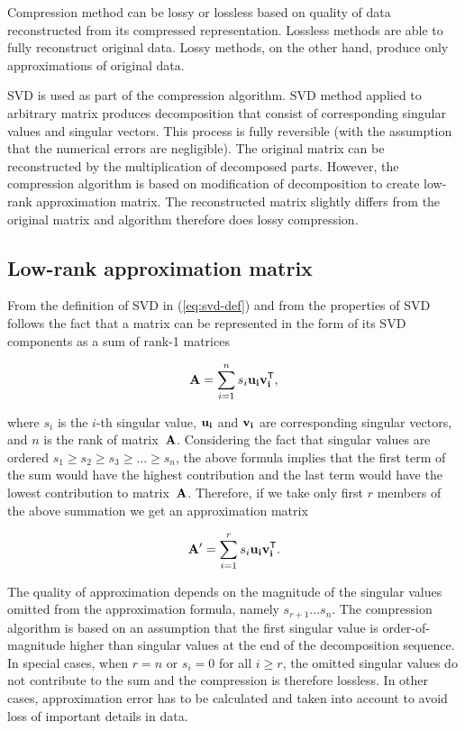 Compression method can be lossy or lossless based on quality of data reconstructed from its compressed representation. Lossless methods are able to fully reconstruct original data. Lossy methods, on the other hand, produce only approximations of original data. 

SVD is used as part of the compression algorithm. SVD method applied to arbitrary matrix produces decomposition that consist of corresponding singular values and singular vectors. This process is fully reversible (with the assumption that the numerical errors are negligible). The original matrix can be reconstructed by the multiplication of decomposed parts. However, the compression algorithm is based on modification of decomposition to create low-rank approximation matrix. The reconstructed matrix slightly differs from the original matrix and algorithm therefore does lossy compression.

\subsection{Low-rank approximation matrix}

From the definition of SVD in (\ref{eq:svd-def}) and from the properties of SVD follows the fact that a matrix can be represented in the form of its SVD components as a sum of rank-1 matrices

\begin{equation}
\mathbf{A}=\sum_{i=1}^{n} s_{i}\bf{u}_i\bf{v}_i^{\mathsf{T}},
\label{eq:svd-expansion}
\end{equation}

\noindent
where $s_i$ is the $i$-th singular value, $\bf{u}_i$ and $\bf{v}_i$ are corresponding singular vectors, and $n$ is the rank of matrix~$\mathbf{A}$. Considering the fact that singular values are ordered $s_{1} \geq s_{2} \geq s_{3} \geq ... \geq s_{n}$, the above formula implies that the first term of the sum would have the highest contribution and the last term would have the lowest contribution to matrix~$\mathbf{A}$. Therefore, if we take only first $r$ members of the above summation we get an approximation matrix

\begin{equation}
\mathbf{A'}=\sum_{i=1}^{r} s_{i}\bf{u}_i\bf{v}_i^{\mathsf{T}}.
\label{eq:svd-approx-expansion}
\end{equation}

The quality of approximation depends on the magnitude of the singular values omitted from the approximation formula, namely $s_{r+1} ...  s_{n}$. The compression algorithm is based on an assumption that the first singular value is order-of-magnitude higher than singular values at the end of the decomposition sequence. In special cases, when $r=n$ or $s_{i}=0$ for all $i \geq r$, the omitted singular values do not contribute to the sum and the compression is therefore lossless. In other cases, approximation error has to be calculated and taken into account to avoid loss of important details in data.


